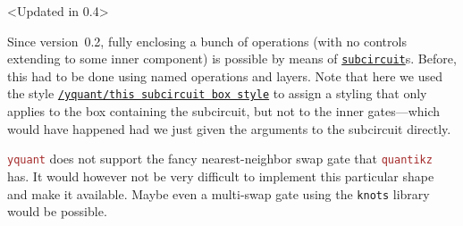 \documentclass{scrartcl}
\makeatletter
\newenvironment{codeexample*}{%
   \VerbatimEnvironment%
   \let\FVB@VerbatimOut\minted@FVB@VerbatimOut
   \let\FVE@VerbatimOut\minted@FVE@VerbatimOut
   \minted@configlang{tex}%
   \minted@fvset
   \begin{VerbatimOut}[codes={\catcode`\^^I=12},firstline,lastline]{\minted@jobname.pyg}%
}{
   \end{VerbatimOut}%
   \minted@langlinenoson%
   \begin{adjustbox}{center}
       \minted@jobname.pyg %
   \end{adjustbox}\nopagebreak
   \expandafter\minted@pygmentize\expandafter{\minted@lang}%
   \minted@langlinenosoff%
   \par%
}
\def\pkg#1{\textcolor{brown}{\texttt{#1}}}
\def\gate#1{\hyperref[gate:#1]{\texttt{#1}}}
\def\style#1{\hyperref[style:#1]{\texttt{#1}}}
\def\Yquant{\pkg{yquant}}
\makeatother
\begin{document}
               \begin{example}<Updated in 0.4>
                  \begin{codeexample*}
                  \end{codeexample*}
                  Since version~0.2, fully enclosing a bunch of operations (with no controls extending to some inner component) is possible by means of \gate{subcircuit}s.
                  Before, this had to be done using named operations and layers.
                  Note that here we used the style \style{/yquant/this subcircuit box style} to assign a styling that only applies to the box containing the subcircuit, but not to the inner gates---which would have happened had we just given the arguments to the subcircuit directly.
               \end{example}

               \Yquant{} does not support the fancy nearest\hyp neighbor swap gate that \pkg{quantikz} has.
               It would however not be very difficult to implement this particular shape and make it available.
               Maybe even a multi\hyp swap gate using the \texttt{knots} library would be possible.

         \clearpage
\end{document}
